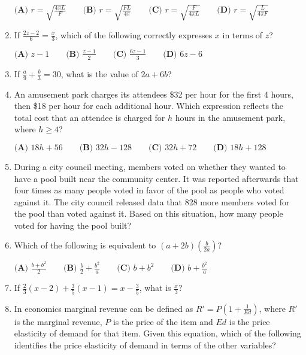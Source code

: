 \documentclass[../satmath.tex]{subfiles}
\begin{document}
\begin{enumerate}[label=\bfseries\arabic*.]
$\textbf{(A) } r=\sqrt{\frac{4\pi L}{F}} \qquad \textbf{(B) } r=\sqrt{\frac{FL}{4\pi}} \qquad \textbf{(C) } r=\sqrt{\frac{F}{4\pi L}} \qquad \textbf{(D) } r=\sqrt{\frac{L}{4\pi F}}$

\item  
If $\frac{2z-2}{6}=\frac{x}{3}$, which of the following correctly expresses $x$ in terms of $z$?

$\textbf{(A) } z-1 \qquad \textbf{(B) } \frac{z-1}{2} \qquad \textbf{(C) } \frac{6z-1}{3} \qquad \textbf{(D) } 6z-6$

\item 
If $\frac{a}{9}+\frac{b}{3}=30$, what is the value of $2a+6b$?

\item 
An amusement park charges its attendees \$32 per hour for the first 4 hours, then \$18 per hour for each additional hour. Which expression reflects the 
total cost that an attendee is charged for $h$ hours in the amusement park, where $h\geq 4$?

$\textbf{(A) } 18h+56 \qquad \textbf{(B) } 32h-128 \qquad \textbf{(C) } 32h+72 \qquad \textbf{(D) } 18h+128$

\item  
During a city council meeting, members voted on whether they wanted to have a pool built near the community center. It was reported afterwards that 
four times as many people voted in favor of the pool as people who voted against it. The city council released data that 828 more members voted 
for the pool than voted against it. Based on this situation, how many people voted for having the pool built?

\item 
Which of the following is equivalent to $(a+2b)\left(\frac{b}{2a}\right)$?

$\textbf{(A) } \frac{b+b^2}{2} \qquad \textbf{(B) } \frac{b}{2}+\frac{b^2}{a} \qquad \textbf{(C) } b+b^2 \qquad \textbf{(D) } b+\frac{b^2}{a}$

\item 
If $\frac{2}{3}(x-2)+\frac{3}{5}(x-1)=x-\frac{3}{5}$, what is $\frac{x}{3}$?

\item 
In economics marginal revenue can be defined as $R'=P\left(1+\frac{1}{Ed}\right)$, where $R'$ is the marginal revenue, $P$ is the price 
of the item and $Ed$ is the price elasticity of demand for that item. Given this equation, which of the following identifies the price elasticity 
of demand in terms of the other variables?


\end{enumerate}
\end{document}
